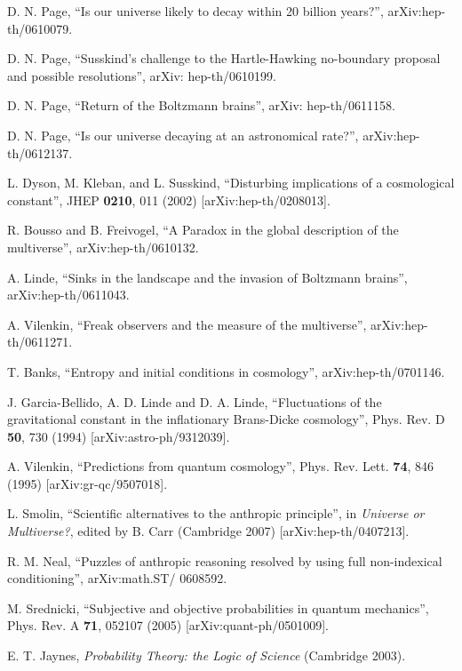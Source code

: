 \documentclass[pra,floatfix,preprint,nofootinbib,12pt]{revtex4}
\begin{document}
\begin{thebibliography}{99}

D. N. Page, 
``Is our universe likely to decay within 20 billion years?'', 
arXiv:hep-th/0610079.

D. N. Page, 
``Susskind's challenge to the Hartle-Hawking no-boundary proposal and possible resolutions'',  
arXiv: hep-th/0610199.

D. N. Page, 
``Return of the Boltzmann brains'',
arXiv: hep-th/0611158. 

D. N. Page, 
``Is our universe decaying at an astronomical rate?'',
arXiv:hep-th/0612137. 

L. Dyson, M. Kleban, and L. Susskind, 
``Disturbing implications of a cosmological constant'', 
JHEP {\bf 0210}, 011 (2002)
[arXiv:hep-th/0208013]. 

R. Bousso and B. Freivogel, 
``A Paradox in the global description of the multiverse'', 
arXiv:hep-th/0610132. 

A. Linde, 
``Sinks in the landscape and the invasion of Boltzmann brains'', 
arXiv:hep-th/0611043. 

A. Vilenkin, 
``Freak observers and the measure of the multiverse'', 
arXiv:hep-th/0611271.

 T. Banks,
``Entropy and initial conditions in cosmology'',
arXiv:hep-th/0701146.

J. Garcia-Bellido, A. D. Linde and D. A. Linde, 
``Fluctuations of the gravitational constant in the inflationary Brans-Dicke cosmology'',
Phys. Rev. D {\bf 50}, 730 (1994) [arXiv:astro-ph/9312039].
 
A. Vilenkin,
``Predictions from quantum cosmology'',
Phys. Rev. Lett. {\bf 74}, 846 (1995) [arXiv:gr-qc/9507018].

L. Smolin,
``Scientific alternatives to the anthropic principle'',
in {\it Universe or Multiverse?}, edited by B. Carr 
(Cambridge 2007)
[arXiv:hep-th/0407213].

R. M. Neal,
``Puzzles of anthropic reasoning resolved by using full non-indexical conditioning'', 
arXiv:math.ST/ 0608592.

M. Srednicki, 
``Subjective and objective probabilities in quantum mechanics'',
Phys. Rev. A {\bf 71}, 052107 (2005) [arXiv:quant-ph/0501009].

E. T. Jaynes, 
{\it Probability Theory: the Logic of Science} (Cambridge 2003).


\end{thebibliography}
\end{document}

